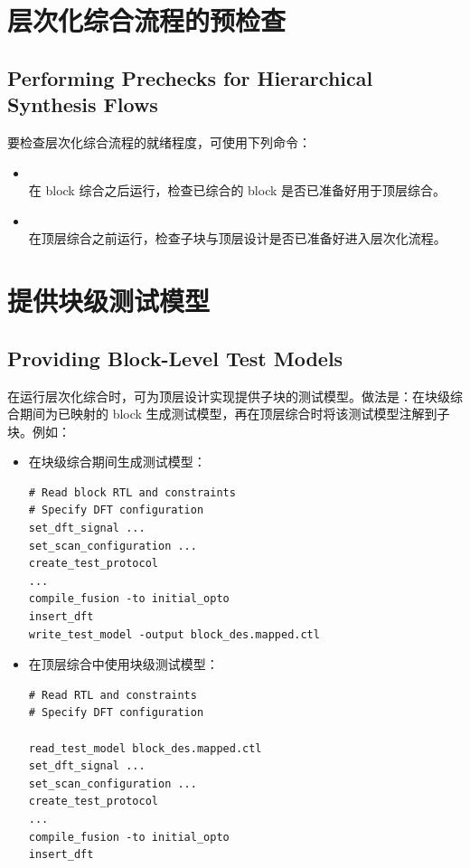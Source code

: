 \section{层次化综合流程的预检查}
\subsection*{Performing Prechecks for Hierarchical Synthesis Flows}

要检查层次化综合流程的就绪程度，可使用下列命令：
\begin{itemize}
  \item {}\\
在 block 综合之后运行，检查已综合的 block 是否已准备好用于顶层综合。
  \item {}\\
在顶层综合之前运行，检查子块与顶层设计是否已准备好进入层次化流程。
\end{itemize}

\section{提供块级测试模型}
\subsection*{Providing Block-Level Test Models}

在运行层次化综合时，可为顶层设计实现提供子块的测试模型。做法是：在块级综合期间为已映射的 block 生成测试模型，再在顶层综合时将该测试模型注解到子块。例如：

\begin{itemize}
  \item 在块级综合期间生成测试模型：
\begin{lstlisting}
# Read block RTL and constraints
# Specify DFT configuration
set_dft_signal ...
set_scan_configuration ...
create_test_protocol
...
compile_fusion -to initial_opto
insert_dft
write_test_model -output block_des.mapped.ctl
\end{lstlisting}

  \item 在顶层综合中使用块级测试模型：
\begin{lstlisting}
# Read RTL and constraints
# Specify DFT configuration

read_test_model block_des.mapped.ctl
set_dft_signal ...
set_scan_configuration ...
create_test_protocol
...
compile_fusion -to initial_opto
insert_dft
\end{lstlisting}
\end{itemize}

